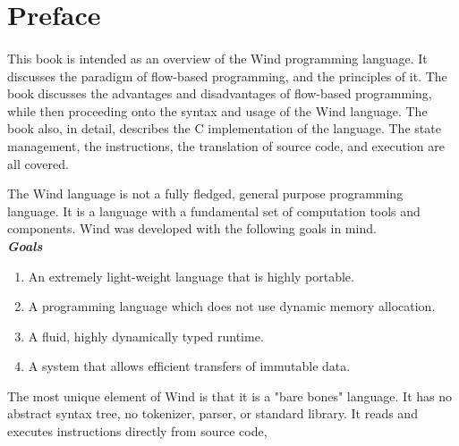 
\section{Preface}

\paragraph{   } This book is intended as an overview of the Wind programming language. It discusses the paradigm of flow-based programming, and the principles of it. The book discusses the advantages and disadvantages of flow-based programming, while then proceeding onto the syntax and usage of the Wind language. The book also, in detail, describes the C implementation of the language. The state management, the instructions, the translation of source code, and execution are all covered. 

\par The Wind language is not a fully fledged, general purpose programming language. It is a language with a fundamental set of computation tools and components. Wind was developed with the following goals in mind. \\

\textbf{\emph{Goals}}
\begin{enumerate}
\item An extremely light-weight language that is highly portable.
\item A programming language which does not use dynamic memory allocation.
\item A fluid, highly dynamically typed runtime.
\item A system that allows efficient transfers of immutable data.
\end{enumerate}

\par The most unique element of Wind is that it is a "bare bones" language. It has no abstract syntax tree, no tokenizer, parser, or standard library. It reads and executes instructions directly from source code,